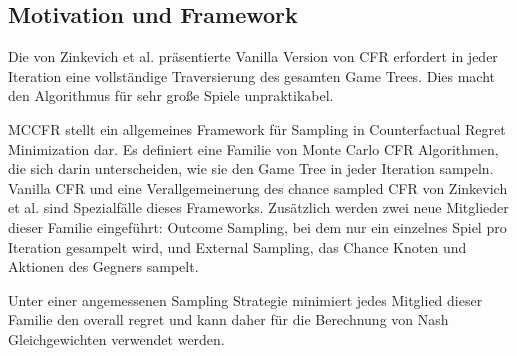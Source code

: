 \subsection{Motivation und Framework}

Die von Zinkevich et al. präsentierte Vanilla Version von CFR erfordert in jeder Iteration eine vollständige Traversierung des gesamten Game Trees.
Dies macht den Algorithmus für sehr große Spiele unpraktikabel.

MCCFR stellt ein allgemeines Framework für Sampling in Counterfactual Regret Minimization dar.
Es definiert eine Familie von Monte Carlo CFR Algorithmen, die sich darin unterscheiden, wie sie den Game Tree in jeder Iteration sampeln.
Vanilla CFR und eine Verallgemeinerung des chance sampled CFR von Zinkevich et al. sind Spezialfälle dieses Frameworks.
Zusätzlich werden zwei neue Mitglieder dieser Familie eingeführt: Outcome Sampling, bei dem nur ein einzelnes Spiel pro Iteration gesampelt wird, und External Sampling, das Chance Knoten und Aktionen des Gegners sampelt.

Unter einer angemessenen Sampling Strategie minimiert jedes Mitglied dieser Familie den overall regret und kann daher für die Berechnung von Nash Gleichgewichten verwendet werden.

